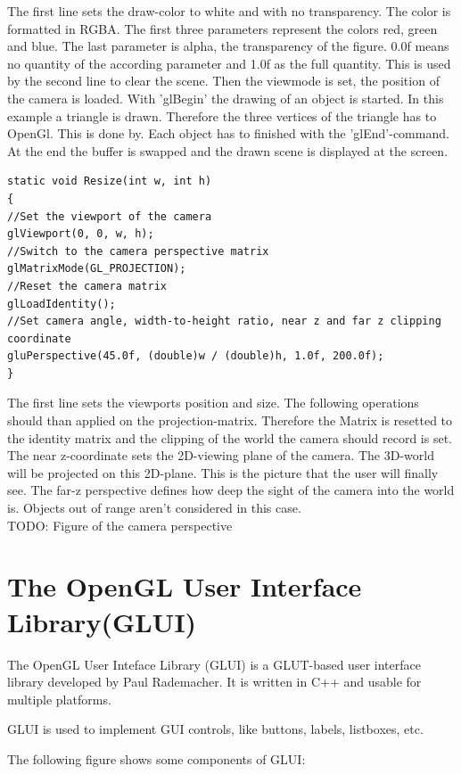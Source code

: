 \documentclass[10pt,a4paper,DIV=11]{scrreprt}
\begin{document}
The first line sets the draw-color to white and with no transparency. The color is formatted in RGBA. The first three parameters represent the colors red, green and blue. The last parameter is alpha, the transparency of the figure. 0.0f means no quantity of the according parameter and 1.0f as the full quantity.
 This is used by the second line to clear the scene.
Then the viewmode is set, the position of the camera is loaded.
With 'glBegin' the drawing of an object is started. In this example a triangle is drawn. Therefore the three vertices of the triangle has to OpenGl. This is done by. Each object has to finished with the 'glEnd'-command.
At the end the buffer is swapped and the drawn scene is displayed at the screen.

\begin{lstlisting}[caption={Resize camera perspective on window resize},label=lst:glut-resize]
static void Resize(int w, int h)
{
//Set the viewport of the camera
glViewport(0, 0, w, h);
//Switch to the camera perspective matrix
glMatrixMode(GL_PROJECTION); 
//Reset the camera matrix
glLoadIdentity();
//Set camera angle, width-to-height ratio, near z and far z clipping coordinate
gluPerspective(45.0f, (double)w / (double)h, 1.0f, 200.0f);
}
\end{lstlisting}

The first line sets the viewports position and size. The following operations should than applied on the projection-matrix. Therefore the Matrix is resetted to the identity matrix and the clipping of the world the camera should record is set. The near z-coordinate sets the 2D-viewing plane of the camera. The 3D-world will be projected on this 2D-plane. This is the picture that the user will finally see. The far-z perspective defines how deep the sight of the camera into the world is. Objects out of range aren't considered in this case. \\

TODO: Figure of the camera perspective

\section{The OpenGL User Interface Library(GLUI)}
The OpenGL User Inteface Library (GLUI) is a GLUT-based user interface library developed by Paul Rademacher. It is written in C++ and usable for multiple platforms.

GLUI is used to implement GUI controls, like buttons, labels, listboxes, etc.

The following figure shows some components of GLUI:
\end{document}
